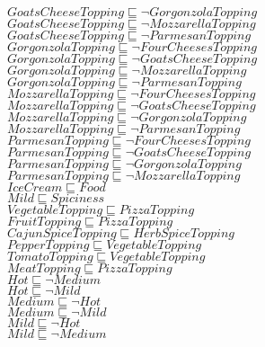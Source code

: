 \documentclass[a4paper,10pt]{article}
\begin{document}
 $GoatsCheeseTopping \sqsubseteq  \lnot GorgonzolaTopping$\\ 
 $GoatsCheeseTopping \sqsubseteq  \lnot MozzarellaTopping$\\ 
 $GoatsCheeseTopping \sqsubseteq  \lnot ParmesanTopping$\\ 
 $GorgonzolaTopping \sqsubseteq  \lnot FourCheesesTopping$\\ 
 $GorgonzolaTopping \sqsubseteq  \lnot GoatsCheeseTopping$\\ 
 $GorgonzolaTopping \sqsubseteq  \lnot MozzarellaTopping$\\ 
 $GorgonzolaTopping \sqsubseteq  \lnot ParmesanTopping$\\ 
 $MozzarellaTopping \sqsubseteq  \lnot FourCheesesTopping$\\ 
 $MozzarellaTopping \sqsubseteq  \lnot GoatsCheeseTopping$\\ 
 $MozzarellaTopping \sqsubseteq  \lnot GorgonzolaTopping$\\ 
 $MozzarellaTopping \sqsubseteq  \lnot ParmesanTopping$\\ 
 $ParmesanTopping \sqsubseteq  \lnot FourCheesesTopping$\\ 
 $ParmesanTopping \sqsubseteq  \lnot GoatsCheeseTopping$\\ 
 $ParmesanTopping \sqsubseteq  \lnot GorgonzolaTopping$\\ 
 $ParmesanTopping \sqsubseteq  \lnot MozzarellaTopping$\\ 
 $IceCream \sqsubseteq Food$\\ 
 $Mild \sqsubseteq Spiciness$\\ 
 $VegetableTopping \sqsubseteq PizzaTopping$\\ 
 $FruitTopping \sqsubseteq PizzaTopping$\\ 
 $CajunSpiceTopping \sqsubseteq HerbSpiceTopping$\\ 
 $PepperTopping \sqsubseteq VegetableTopping$\\ 
 $TomatoTopping \sqsubseteq VegetableTopping$\\ 
 $MeatTopping \sqsubseteq PizzaTopping$\\ 
 $Hot \sqsubseteq  \lnot Medium$\\ 
 $Hot \sqsubseteq  \lnot Mild$\\ 
 $Medium \sqsubseteq  \lnot Hot$\\ 
 $Medium \sqsubseteq  \lnot Mild$\\ 
 $Mild \sqsubseteq  \lnot Hot$\\ 
 $Mild \sqsubseteq  \lnot Medium$\\ 
\end{document}
